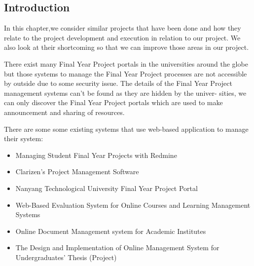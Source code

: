 \documentclass{article}
\begin{document}
\subsection{Introduction}
In this chapter,we consider similar projects that have been done and how they
relate to the project development and execution in relation to our project. We
also look at their shortcoming so that we can improve those areas in our project.
\par There exist many Final Year Project portals in the universities around the
globe but those systems to manage the Final Year Project processes are not
accessible by outside due to some security issue. The details of the Final Year
Project management systems can't be found as they are hidden by the univer-
sities, we can only discover the Final Year Project portals which are used to
make announcement and sharing of resources.
\par There are some some existing systems that use web-based application to manage their system:\\
\begin{itemize}
\item Managing Student Final Year Projects with Redmine
\item Clarizen's Project Management Software
\item Nanyang Technological University Final Year Project Portal
\item Web-Based Evaluation System for Online Courses and Learning Management Systems
\item Online Document Management system for Academic Institutes
\item The Design and Implementation of Online Management System for Undergraduates’ Thesis (Project)
\end{itemize}
\end{document}
